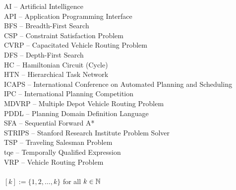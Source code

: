 AI -- Artificial Intelligence\\
API -- Application Programming Interface\\
BFS -- Breadth-First Search\\
CSP -- Constraint Satisfaction Problem\\
CVRP -- Capacitated Vehicle Routing Problem\\
DFS -- Depth-First Search\\
HC -- Hamiltonian Circuit (Cycle)\\
HTN -- Hierarchical Task Network\\
ICAPS -- International Conference on Automated Planning and Scheduling\\
IPC -- International Planning Competition\\
MDVRP -- Multiple Depot Vehicle Routing Problem\\
PDDL -- Planning Domain Definition Language\\
SFA -- Sequential Forward A*\\
STRIPS -- Stanford Research Institute Problem Solver\\
TSP -- Traveling Salesman Problem\\
tqe -- Temporally Qualified Expression\\
VRP -- Vehicle Routing Problem\\
\\
$[k] := \{1, 2, \ldots, k\}$ for all $k \in \mathbb{N}$\\
